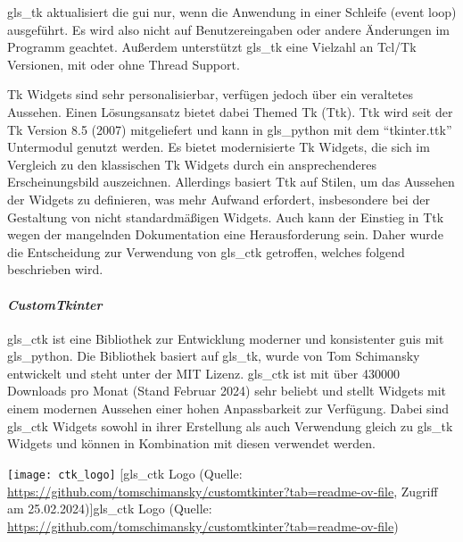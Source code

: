 \gls{gls_tk} aktualisiert die \acs{gui} nur, wenn die Anwendung in einer Schleife (event loop) ausgeführt. Es wird also nicht auf Benutzereingaben oder andere Änderungen im Programm geachtet. Außerdem unterstützt \gls{gls_tk} eine Vielzahl an Tcl/Tk Versionen, mit oder ohne Thread Support. \cite[vgl.][]{Python_Software_Foundation_Tk:o.J.}

Tk Widgets sind sehr personalisierbar, verfügen jedoch über ein veraltetes Aussehen. Einen Lösungsansatz bietet dabei Themed Tk (Ttk). Ttk wird seit der Tk Version 8.5 (2007) mitgeliefert und kann in \gls{gls_python} mit dem \enquote{tkinter.ttk} Untermodul genutzt werden. Es bietet modernisierte Tk Widgets, die sich im Vergleich zu den klassischen Tk Widgets durch ein ansprechenderes Erscheinungsbild auszeichnen. Allerdings basiert Ttk  auf Stilen, um das Aussehen der Widgets zu definieren, was mehr Aufwand erfordert, insbesondere bei der Gestaltung von nicht standardmäßigen Widgets. Auch kann der Einstieg in Ttk wegen der mangelnden Dokumentation eine Herausforderung sein. Daher wurde die Entscheidung zur Verwendung von \gls{gls_ctk} getroffen, welches folgend beschrieben wird. \cite[vgl.][]{Python_Software_Foundation_Tk:o.J., stackoverflow_tk_ttk:2013}


\paragraph{\textit{CustomTkinter}}\label{ctk_kapitel}
\begin{minipage}{0.6\textwidth}
	\gls{gls_ctk} ist eine Bibliothek zur Entwicklung moderner und konsistenter \acsp{gui} mit \gls{gls_python}. Die Bibliothek basiert auf \gls{gls_tk}, wurde von Tom Schimansky entwickelt und steht unter der MIT Lizenz. \gls{gls_ctk} ist mit über 430000 Downloads pro Monat (Stand Februar 2024) sehr beliebt und stellt Widgets mit einem modernen Aussehen einer hohen Anpassbarkeit zur Verfügung. Dabei sind \gls{gls_ctk} Widgets sowohl in ihrer Erstellung als auch Verwendung gleich zu \gls{gls_tk} Widgets und können in Kombination mit diesen verwendet werden. \cite[vgl.][]{Schimansky_Git:o.J.}
\end{minipage}%
\hfill
\begin{minipage}{0.37\textwidth}
	\centering	
	\texttt{[image: ctk\_logo]}
	[\gls{gls_ctk} Logo (Quelle: \url{https://github.com/tomschimansky/customtkinter?tab=readme-ov-file}, Zugriff am 25.02.2024)]{\gls{gls_ctk} Logo (Quelle: 
		\url{https://github.com/tomschimansky/customtkinter?tab=readme-ov-file}) \label{fig:ctk_logo}}
\end{minipage}
\vspace{1ex}

